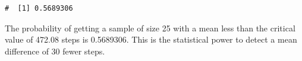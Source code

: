 \documentclass[letterpaper,11pt,twoside,]{pinp}
\begin{document}
\begin{Shaded}
\begin{Highlighting}[]
\OtherTok{\textless{}{-}} \NormalTok{(} \NormalTok{, } \NormalTok{, } \SpecialCharTok{/}\NormalTok{(}\NormalTok{))}
\NormalTok{(} \NormalTok{, } \SpecialCharTok{/}\NormalTok{(}\NormalTok{), } \NormalTok{)}
\end{Highlighting}
\end{Shaded}

\begin{ShadedResult}
\begin{verbatim}
#  [1] 0.5689306
\end{verbatim}
\end{ShadedResult}

The probability of getting a sample of size 25 with a mean less than the
critical value of 472.08 steps is 0.5689306. This is the statistical
power to detect a mean difference of 30 fewer steps.

\begin{Shaded}
\begin{Highlighting}[]
\NormalTok{(} \NormalTok{, } \NormalTok{, } \NormalTok{, } \NormalTok{,}
            \NormalTok{, } \NormalTok{)}
\end{Highlighting}
\end{Shaded}
\end{document}
